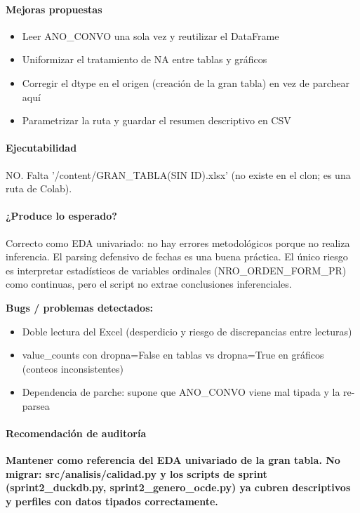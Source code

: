 \paragraph{Mejoras propuestas}
\begin{itemize}
  \item Leer ANO\_CONVO una sola vez y reutilizar el DataFrame
  \item Uniformizar el tratamiento de NA entre tablas y gráficos
  \item Corregir el dtype en el origen (creación de la gran tabla) en vez de parchear aquí
  \item Parametrizar la ruta y guardar el resumen descriptivo en CSV
\end{itemize}

\paragraph{Ejecutabilidad}
NO. Falta '/content/GRAN\_TABLA(SIN ID).xlsx' (no existe en el clon; es una ruta de Colab).

\paragraph{¿Produce lo esperado?}
Correcto como EDA univariado: no hay errores metodológicos porque no realiza inferencia. El parsing defensivo de fechas es una buena práctica. El único riesgo es interpretar estadísticos de variables ordinales (NRO\_ORDEN\_FORM\_PR) como continuas, pero el script no extrae conclusiones inferenciales.

\begin{tcolorbox}[riesgo]
\textbf{Bugs / problemas detectados:}
\begin{itemize}
  \item Doble lectura del Excel (desperdicio y riesgo de discrepancias entre lecturas)
  \item value\_counts con dropna=False en tablas vs dropna=True en gráficos (conteos inconsistentes)
  \item Dependencia de parche: supone que ANO\_CONVO viene mal tipada y la re-parsea
\end{itemize}
\end{tcolorbox}

\paragraph{Recomendación de auditoría}
\textbf{Mantener como referencia del EDA univariado de la gran tabla. No migrar: src/analisis/calidad.py y los scripts de sprint (sprint2\_duckdb.py, sprint2\_genero\_ocde.py) ya cubren descriptivos y perfiles con datos tipados correctamente.}

